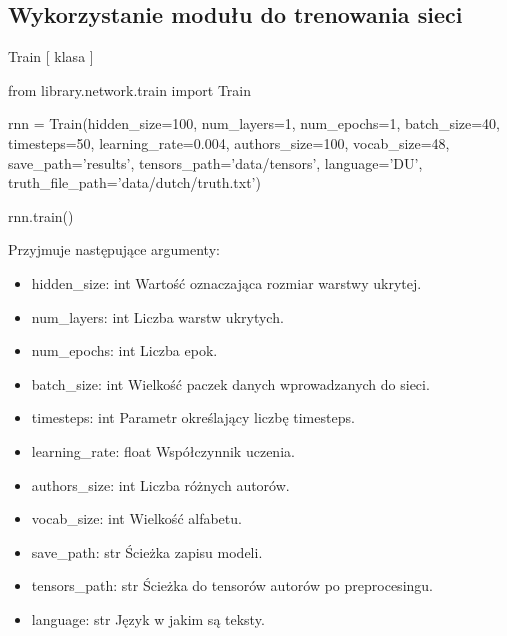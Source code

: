 \newpage
\subsection{Wykorzystanie modułu do trenowania sieci}
\myspace
{}
\myspace

\item {Train [ klasa ] }
\begin{import}
from library.network.train import Train

rnn = Train(hidden_size=100,
            num_layers=1,
            num_epochs=1,
            batch_size=40,
            timesteps=50,
            learning_rate=0.004,
            authors_size=100,
            vocab_size=48,
            save_path='results',
            tensors_path='data/tensors',
            language='DU',
            truth_file_path='data/dutch/truth.txt')
            
rnn.train()
\end{import}

Przyjmuje następujące argumenty:
\begin{itemize}
	\item hidden\_size: int
		\newline Wartość oznaczająca rozmiar warstwy ukrytej.
	\item num\_layers: int
		\newline Liczba warstw ukrytych.
	\item num\_epochs: int
		\newline Liczba epok.
	\item batch\_size: int
		\newline Wielkość paczek danych wprowadzanych do sieci.
	\item timesteps: int
		\newline Parametr określający liczbę timesteps.
	\item learning\_rate: float
		\newline Współczynnik uczenia.
	\item authors\_size: int
		\newline Liczba różnych autorów.
	\item vocab\_size: int
		\newline Wielkość alfabetu.
	\item save\_path: str
		\newline Ścieżka zapisu modeli.
	\item tensors\_path: str
		\newline Ścieżka do tensorów autorów po preprocesingu.
	\item language: str
		\newline Język w jakim są teksty.
		
\end{itemize}

